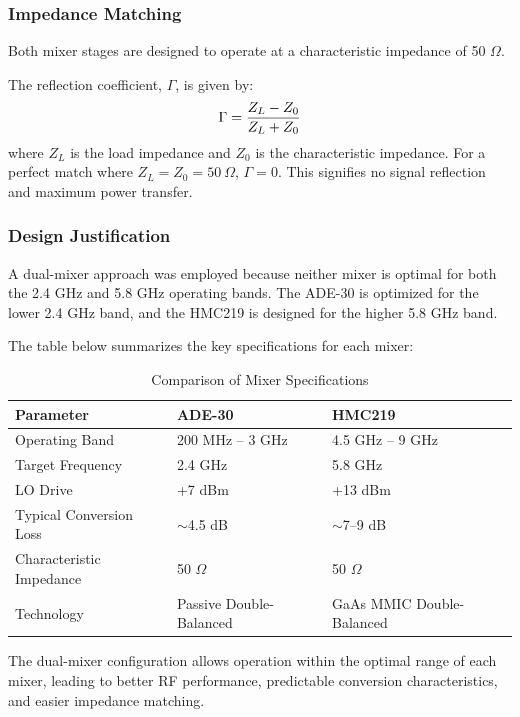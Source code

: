 \documentclass[12pt,a4paper]{report}
\begin{document}
	\subsubsection{Impedance Matching}
	Both mixer stages are designed to operate at a characteristic impedance of 50 $\Omega$.
	
	The reflection coefficient, $\Gamma$, is given by:
	\begingroup
	\setlength{\mathindent}{0pt}
	\begin{equation*}
		\hfill
		\Gamma = \frac{Z_L - Z_0}{Z_L + Z_0}
		\hfill
	\end{equation*}
	\endgroup
	where $Z_L$ is the load impedance and $Z_0$ is the characteristic impedance. For a perfect match where $Z_L = Z_0 = 50\ \Omega$, $\Gamma = 0$. This signifies no signal reflection and maximum power transfer.
	\subsubsection{Design Justification}
	A dual-mixer approach was employed because neither mixer is optimal for both the 2.4 GHz and 5.8 GHz operating bands. The ADE-30 is optimized for the lower 2.4 GHz band, and the HMC219 is designed for the higher 5.8 GHz band.
	
	The table below summarizes the key specifications for each mixer:
	
	\begin{table}[htbp]
		\centering
		\caption{Comparison of Mixer Specifications}
		\label{tab:mixer_comparison}
		\begin{tabular}{p{5cm} p{4cm} p{4cm}}
			\toprule
			\textbf{Parameter} & \textbf{ADE-30} & \textbf{HMC219} \\
			\midrule
			Operating Band & 200 MHz -- 3 GHz & 4.5 GHz -- 9 GHz \\
			Target Frequency & 2.4 GHz & 5.8 GHz \\
			LO Drive & +7 dBm & +13 dBm \\
			Typical Conversion Loss & $\sim$4.5 dB & $\sim$7--9 dB \\
			Characteristic Impedance & 50 $\Omega$ & 50 $\Omega$ \\
			Technology & Passive Double-Balanced & GaAs MMIC Double-Balanced \\
			\bottomrule
		\end{tabular}
	\end{table}
	
	The dual-mixer configuration allows operation within the optimal range of each mixer, leading to better RF performance, predictable conversion characteristics, and easier impedance matching.
	
\end{document}
